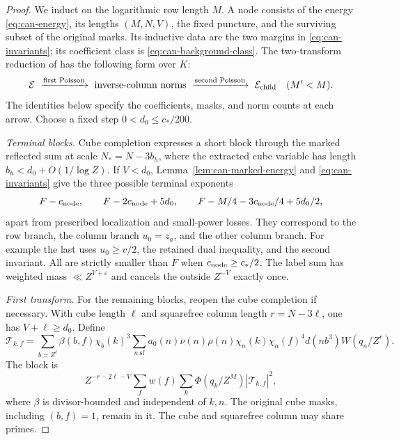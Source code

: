 \documentclass[11pt,a4paper]{article}
\numberwithin{equation}{section}
\theoremstyle{definition}
\theoremstyle{remark}
\newcommand{\eps}{\varepsilon}
\begin{document}
\begin{proof}
We induct on the logarithmic row length $M$. A node consists of the
energy \eqref{eq:can-energy}, its lengths $(M,N,V)$, the fixed puncture,
and the surviving subset of the original marks. Its inductive data are
the two margins in \eqref{eq:can-invariants}; its coefficient class is
\eqref{eq:can-background-class}. The two-transform reduction of
\cite[Section~17.5]{Q} has the following form over $K$:
\[
 \mathcal E
 \ \xrightarrow{\text{first Poisson}}\
 \text{inverse-column norms}
 \ \xrightarrow{\text{second Poisson}}\
 \mathcal E_{\rm child}\quad(M'<M).
\]
The identities below specify the coefficients, masks, and norm counts
at each arrow. Choose a fixed step $0<d_0\le c_*/200$.

\smallskip\noindent\emph{Terminal blocks.}
Cube completion expresses a short block through the marked reflected
sum at scale $N_*=N-3b_h$, where the extracted cube variable has
length $b_h<d_0+O(1/\log Z)$.
If $V<d_0$, Lemma~\ref{lem:can-marked-energy} and
\eqref{eq:can-invariants} give the three possible terminal exponents
\begin{equation}\label{eq:can-terminal-ledger}
 F-c_{\rm node},\qquad
 F-2c_{\rm node}+5d_0,\qquad
 F-M/4-3c_{\rm node}/4+5d_0/2,
\end{equation}
apart from prescribed localization and small-power losses.
They correspond to the row branch, the column branch $u_0=z_a$,
and the other column branch.  For example the last uses
$u_0\ge v/2$, the retained dual inequality, and the second invariant.
All are strictly smaller than $F$ when $c_{\rm node}\ge c_*/2$.
The label sum has weighted mass $\ll Z^{V+\eps}$ and cancels the
outside $Z^{-V}$ exactly once.

\smallskip\noindent\emph{First transform.}
For the remaining blocks, reopen the cube completion if necessary.
With cube length $\ell$ and squarefree column length $r=N-3\ell$,
one has $V+\ell\ge d_0$.  Define
\[
 \mathcal T_{k,f}
 =\sum_{b\asymp Z^\ell}\beta(b,f)\chi_b(k)^3
   \sum_{n\ \mathrm{sf}}a_0(n)\nu(n)\rho(n)
       \chi_n(k)\chi_n(f)^4d(nb^3)W(q_n/Z^r).
\]
The block is
\[
 Z^{-r-2\ell-V}\sum_f w(f)
       \sum_k\Phi(q_k/Z^M)|\mathcal T_{k,f}|^2,
\]
where $\beta$ is divisor-bounded and independent of $k,n$.
The original cube masks, including $(b,f)=1$, remain in it.
The cube and squarefree column may share primes.


\end{proof}
\end{document}
